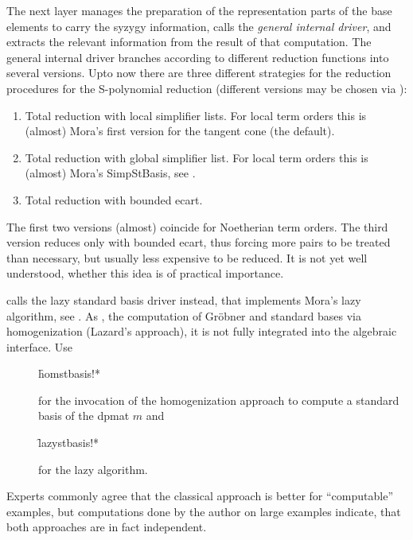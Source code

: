 The next layer manages the preparation of the representation parts
of the base elements to carry the syzygy information, calls the
\emph{general internal driver}, and extracts the relevant information
from the result of that computation. The general internal driver
branches according to different reduction functions into several
versions. Upto now there are three different strategies for the
reduction procedures for the S-polynomial reduction (different
versions may be chosen via ):
\begin{enumerate}
\item Total reduction with local simplifier lists. For local term
orders this is (almost) Mora's first version for the tangent cone (the
default).

\item Total reduction with global simplifier list. For local term
orders this is (almost) Mora's SimpStBasis, see \cite{MoraPfisterTraverso:92}.

\item Total reduction with bounded ecart.
\end{enumerate}
The first two versions (almost) coincide for Noetherian term
orders. The third version reduces only with bounded ecart, thus
forcing more pairs to be treated than necessary, but usually less
expensive to be reduced. It is not yet well understood, whether this
idea is of practical importance.

 calls the lazy standard basis driver instead,
that implements Mora's lazy algorithm, see \cite{MoraPfisterTraverso:92}. As
, the computation of Gr\"obner and standard bases via
homogenization (Lazard's approach), it is not fully integrated into
the algebraic interface. Use
\begin{description}

\item[]
  \begin{syntax}
    \f{homstbasis!*} 
  \end{syntax}
  \hypertarget{procedure:HOMSTBASIS!*}{}
for the invocation of the homogenization approach to compute a
standard basis of the dpmat $m$ and

\item[]
  \begin{syntax}
    \f{lazystbasis!*} 
  \end{syntax}
  \hypertarget{procedure:LAZYSTBASIS!*}{}
for the lazy algorithm.
\end{description}
Experts commonly agree that the classical approach is better for
``computable'' examples, but computations done by the author
on large examples indicate, that both approaches are in fact
independent.
\medskip

